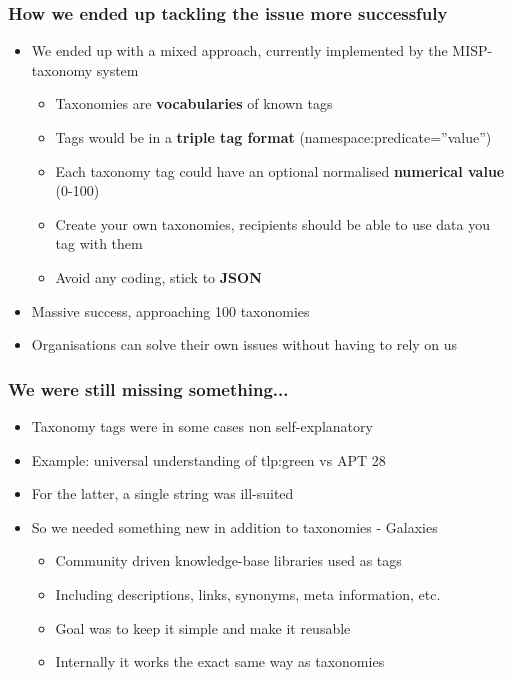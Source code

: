 \begin{frame}
\frametitle{How we ended up tackling the issue more successfuly}
\begin{itemize}
       \item We ended up with a mixed approach, currently implemented by the MISP-taxonomy system
        \begin{itemize}
                \item Taxonomies are {\bf vocabularies} of known tags
                \item Tags would be in a {\bf triple tag format} (namespace:predicate=''value'')
                \item Each taxonomy tag could have an optional normalised {\bf numerical value} (0-100)
                \item Create your own taxonomies, recipients should be able to use data you tag with them
                \item Avoid any coding, stick to {\bf JSON}
        \end{itemize}
        \item Massive success, approaching 100 taxonomies
        \item Organisations can solve their own issues without having to rely on us
\end{itemize}
\end{frame}

\begin{frame}
\frametitle{We were still missing something...}
\begin{itemize}
       \item Taxonomy tags were in some cases non self-explanatory
       \item Example: universal understanding of tlp:green vs APT 28
       \item For the latter, a single string was ill-suited
       \item So we needed something new in addition to taxonomies - Galaxies
        \begin{itemize}
                \item Community driven knowledge-base libraries used as tags
                \item Including descriptions, links, synonyms, meta information, etc. 
                \item Goal was to keep it simple and make it reusable
                \item Internally it works the exact same way as taxonomies
        \end{itemize}
\end{itemize}
\end{frame}

